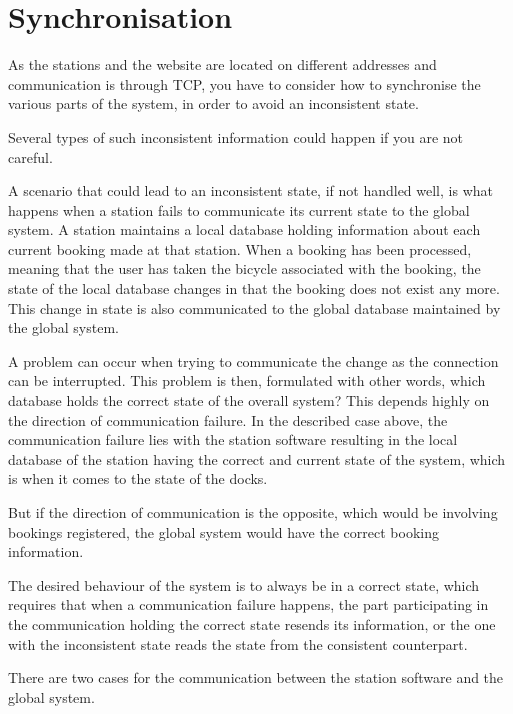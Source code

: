 \section{Synchronisation}\label{sec:sync}
As the stations and the website are located on different addresses and communication is through TCP, you have to consider how to synchronise the various parts of the system, in order to avoid an inconsistent state.

Several types of such inconsistent information could happen if you are not careful.

A scenario that could lead to an inconsistent state, if not handled well, is what happens when a station fails to communicate its current state to the global system.
A station maintains a local database holding information about each current booking made at that station.
When a booking has been processed, meaning that the user has taken the bicycle associated with the booking, the state of the local database changes in that the booking does not exist any more.
This change in state is also communicated to the global database maintained by the global system.

A problem can occur when trying to communicate the change as the connection can be interrupted.
This problem is then, formulated with other words, which database holds the correct state of the overall system?
This depends highly on the direction of communication failure. 
In the described case above, the communication failure lies with the station software resulting in the local database of the station having the correct and current state of the system, which is when it comes to the state of the docks.


But if the direction of communication is the opposite, which would be involving bookings registered, the global system would have the correct booking information.

The desired behaviour of the system is to always be in a correct state, which requires that when a communication failure happens, the part participating in the communication holding the correct state resends its information, or the one with the inconsistent state reads the state from the consistent counterpart.

There are two cases for the communication between the station software and the global system.

